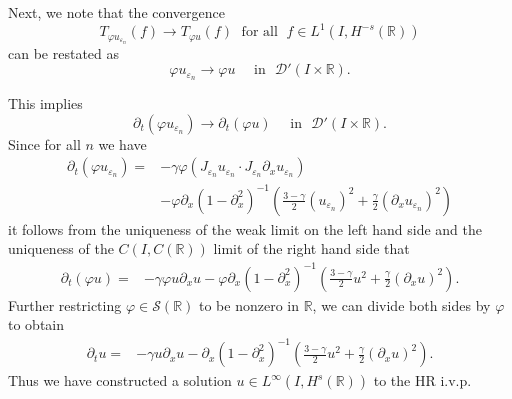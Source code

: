 \documentclass{beamer}
\newcommand{\rr}{\mathbb{R}}
\newcommand{\p}{\partial}
\newcommand{\ee}{\varepsilon}
\newcommand{\vp}{\varphi}
\begin{document}
    \begin{frame}
		Next, we note that the convergence  
		\begin{equation}
			\label{hhweak-conv-2}
			T_{\vp u_{\ee_n}}(f)  \longrightarrow  T_{\vp u} (f) \;
			\text{ for all } \;  f \in L^1(I, H^{-s}(\rr))
		\end{equation}
		can be restated as 
		\begin{equation}
			\vp u_{\ee_n}  \longrightarrow  \vp u
			\quad
			\text{ in }  \,\,
			\mathcal{D}'(I\times \rr).
		\end{equation}
    \end{frame}
    \begin{frame}
		This implies 
		\begin{equation}
			\label{hhdistib-conv-2}
			\p_t(\vp u_{\ee_n})  \longrightarrow  \p_t (\vp u)
			\quad
			\text{ in }  \,\, \mathcal{D}'(I\times \rr).
		\end{equation}
		Since for all $n$ we have 
		\begin{equation}
			\begin{split}
			 \p_t (\vp u_{\ee_n})
			 = & -\gamma \vp
			(J_{\varepsilon_n} u_{\varepsilon_n}  \cdot
			J_{\varepsilon_n}\partial_x u_{\varepsilon_n})
			\\
			& -
			\vp \p_x(1- \p_x^2)^{-1} \left( \frac{3-\gamma}{2} (u_{\ee_n})^2
			 + \frac{\gamma}{2} (\p_x u_{\ee_n})^2 \right )
		 \end{split}
		\end{equation}
		it follows from the uniqueness of the weak limit on the left hand side
    and the uniqueness of the
		$C(I, C(\rr))$ limit of the right hand side that 
		\begin{equation}
			\begin{split}
			 \p_t (\vp u)
			 = & -\gamma \vp
			u \p_x u - \vp \p_x(1- \p_x^2)^{-1} \left( \frac{3-\gamma}{2} u^2
			 + \frac{\gamma}{2} (\p_x u)^2 \right ).
			\label{hhadone}
			\end{split}
		\end{equation}
		Further restricting $\vp \in \mathcal{S}(\rr)$ to be nonzero in
		$\rr$, we
		can divide both sides by $\vp$ to obtain
		\begin{equation}
			\label{hh2yy}
			\begin{split}
			 \p_t  u
			 = & -\gamma
			u \p_x u - \p_x(1- \p_x^2)^{-1} \left( \frac{3-\gamma}{2} u^2
			 + \frac{\gamma}{2} (\p_x u)^2 \right ).
			\end{split}
		\end{equation}
		Thus we have constructed a solution $u \in L^\infty(I, H^s(\rr))$
		to the HR i.v.p. 
		\vskip0.1in

%
%

\end{frame}
%
%
%
%
%
\end{document}
